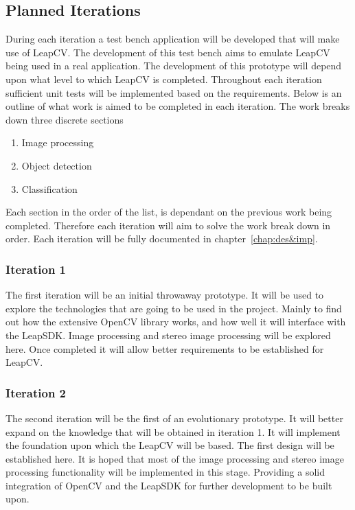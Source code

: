 \documentclass[11pt,oneside]{report}
\begin{document}
			\subsection{Planned Iterations}
					During each iteration a test bench application will be developed that will make use of LeapCV.
					The development of this test bench aims to emulate LeapCV being used in a real application.
					The development of this prototype will depend upon what level to which LeapCV is completed.
					Throughout each iteration sufficient unit tests will be implemented based on the requirements.
					Below is an outline of what work is aimed to be completed in each iteration.
					The work breaks down three discrete sections
					\begin{enumerate}
						\item Image processing
						\item Object detection
						\item Classification
					\end{enumerate}
					Each section in the order of the list, is dependant on the previous work being completed.	
					Therefore each iteration will aim to solve the work break down in order.
					Each iteration will be fully documented in chapter~\ref{chap:des&imp}.
					\subsubsection{Iteration 1}
					The first iteration will be an initial throwaway prototype.
					It will be used to explore the technologies that are going to be used in the project.
					Mainly to find out how the extensive OpenCV library works, and how well it will interface with the LeapSDK.
					Image processing and stereo image processing will be explored here.
					Once completed it will allow better requirements to be established for LeapCV.
					\subsubsection{Iteration 2}
					The second iteration will be the first of an evolutionary prototype.
					It will better expand on the knowledge that will be obtained in iteration 1.
					It will implement the foundation upon which the LeapCV will be based.
					The first design will be established here.
					It is hoped that most of the image processing and stereo image processing functionality will be implemented in this stage.
					Providing a solid integration of OpenCV and the LeapSDK for further development to be built upon.
\end{document}
